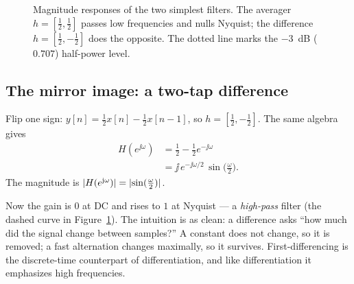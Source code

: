 \begin{figure}[H]
\centering
{}
\caption{Magnitude responses of the two simplest filters. The averager
$h=[\tfrac12,\tfrac12]$ passes low frequencies and nulls Nyquist; the
difference $h=[\tfrac12,-\tfrac12]$ does the opposite. The dotted line marks the
$-3$~dB ($0.707$) half-power level.}
\label{ch14:fig-avg}
\end{figure}

\subsection{The mirror image: a two-tap difference}

Flip one sign: $y[n] = \tfrac12 x[n] - \tfrac12 x[n-1]$, so $h=[\tfrac12,-\tfrac12]$.
The same algebra gives
\begin{align*}
  H(e^{\jj\omega}) &= \tfrac12 - \tfrac12 e^{-\jj\omega} \\
   &= \jj\,e^{-\jj\omega/2}\,\sin\!\big(\tfrac{\omega}{2}\big).
\end{align*}
The magnitude is $\lvert H(e^{\mathrm{j}\omega})\rvert = \lvert\sin(\tfrac{\omega}{2})\rvert$.

Now the gain is $0$ at DC and rises to $1$ at Nyquist --- a \emph{high-pass}
filter (the dashed curve in Figure~\ref{ch14:fig-avg}). The intuition is as
clean: a difference asks ``how much did the signal change between samples?'' A
constant does not change, so it is removed; a fast alternation changes maximally,
so it survives. First-differencing is the discrete-time counterpart of differentiation,
and like differentiation it emphasizes high frequencies.

